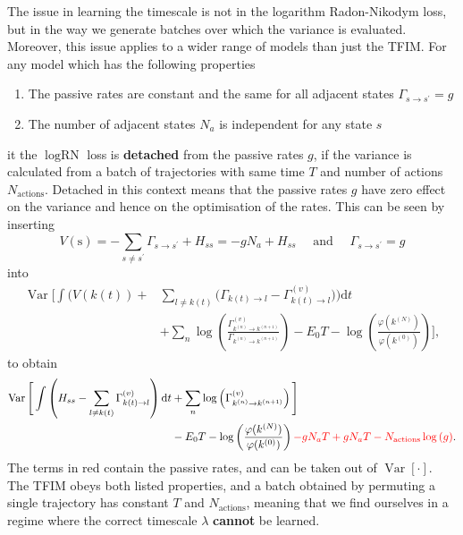 The issue in learning the timescale is not in the logarithm Radon-Nikodym loss, but in the way we generate batches over which the variance is evaluated. Moreover, this issue applies to a wider range of models than just the TFIM. For any model which has the following properties
\begin{enumerate}
	\item The passive rates are constant and the same for all adjacent states $\Gamma_{s \rightarrow s^{\prime}}=g$
	\item The number of adjacent states $N_a$ is independent for any state $s$
\end{enumerate}
it the $\log \text{RN}$ loss is \textbf{detached} from the passive rates $g$, if the variance is calculated from a batch of trajectories with same time $T$ and number of actions $N_{\text{actions}}$. Detached in this context means that the passive rates $g$ have zero effect on the variance and hence on the optimisation of the rates. This can be seen by inserting 
\begin{equation}
	V(\mathrm{s})=-\sum_{s \neq s^{\prime}} \Gamma_{s \rightarrow s^{\prime}}+H_{s s}=-g N_a + H_{s s} \quad \text{ and } \quad \Gamma_{s \rightarrow s^{\prime}}=g
\end{equation}
into
\begin{equation}
	\begin{aligned}
			{\operatorname{Var}}\Bigg[\int\bigg(V(k(t))+&\sum_{l \neq k(t)}\bigg(\Gamma_{k(t) \rightarrow l}-\Gamma_{k(t) \rightarrow l}^{(v)}\bigg)\bigg) \mathrm{d} t \\
		&+\sum_{n} \log \left(\frac{\Gamma_{k^{(n)} \rightarrow k^{(n+1)}}^{(v)}}{\Gamma_{k^{(n)} \rightarrow k^{(n+1)}}}\right)-E_{0} T-\log \left(\frac{\varphi(k^{(N)})}{\varphi(k^{(0)})}\right)
		\Bigg],
	\end{aligned}
\end{equation}
to obtain
\begin{equation}
	\begin{aligned}
		\operatorname{Var}\Bigg[\int\left(H_{s s}-\sum_{l \neq k(t)}\Gamma_{k(t) \rightarrow l}^{(v)}\right)\mathrm{d} t 
		&+ \sum_{n} \log \left(\Gamma_{k^{(n)} \rightarrow k^{(n+1)}}^{(v)}\right)\Bigg] \\ &-E_{0} T -\log \left(\frac{\varphi(k^{(N)})}{\varphi(k^{(0)})}\right) \textcolor{red}{- gN_aT + gN_aT - N_{\text{actions}}\log{(g)}}.
	\end{aligned}
\end{equation}
The terms in red contain the passive rates, and can be taken out of $\operatorname{Var}[\cdot]$. The TFIM obeys both listed properties, and a batch obtained by permuting a single trajectory has constant $T$ and $N_{\text{actions}}$, meaning that we find ourselves in a regime where the correct timescale $\lambda$ \textbf{cannot} be learned. 

